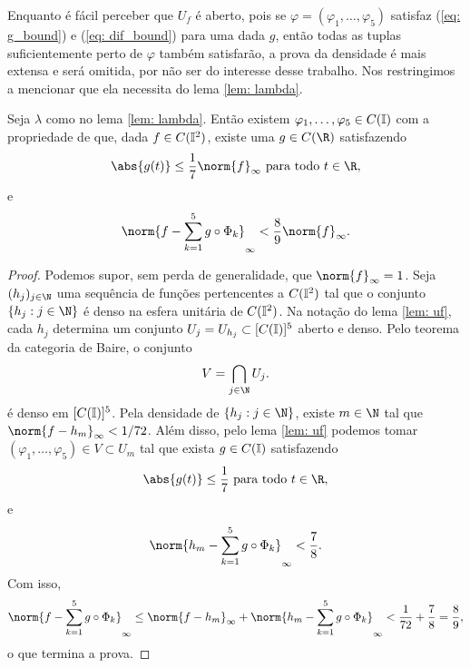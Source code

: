 Enquanto é fácil perceber que \( U_{ f } \) é aberto, pois se \( \varphi = ( \varphi_{ 1 }, \dots, \varphi_{ 5 } ) \) satisfaz (\ref{eq: g_bound}) e (\ref{eq: dif_bound}) para uma dada \( g \), então todas as tuplas suficientemente perto de \( \varphi \) também satisfarão, a prova da densidade é mais extensa e será omitida, por não ser do interesse desse trabalho.
Nos restringimos a mencionar que ela necessita do lema \ref{lem: lambda}.
\begin{lem}
    Seja \( \lambda \) como no lema \ref{lem: lambda}.
    Então existem \( \varphi_{ 1 }, \dots, \varphi_{ 5 } \in C(\mathbb{I}) \) com a propriedade de que, dada \( f \in C(\mathbb{I}^2) \), existe uma \( g \in C(\R) \) satisfazendo
    \begin{equation}
        \abs{ g(t) } \leq \frac{ 1 }{ 7 } \norm{ f }_{ \infty } \text{ para todo } t \in \R
    ,\end{equation}
    e
    \begin{equation}
        \norm{ 
            f - \sum_{ k=1 }^{ 5 } g \circ \Phi_{ k }
         }_{ \infty } < \frac{ 8 }{ 9 } \norm{ f }_{ \infty }
    .\end{equation}
    \label{lem: baire}
\end{lem}
\begin{proof}
    Podemos supor, sem perda de generalidade, que \( \norm{ f }_{ \infty } = 1 \).
    Seja \( (h_{ j })_{ j\in\N } \) uma sequência de funções pertencentes a \( C(\mathbb{I}^2) \) tal que o conjunto \( \left\{ h_{ j } : j\in \N \right\} \) é denso na esfera unitária de \( C(\mathbb{I}^2) \).
    Na notação do lema \ref{lem: uf}, cada \( h_{ j } \) determina um conjunto \( U_{ j } = U_{ h_{ j } } \subset  [C(\mathbb{I})]^{ 5 } \) aberto e denso.
    Pelo teorema da categoria de Baire, o conjunto
    \begin{equation}
        V = \bigcap_{ j\in\N } U_{ j }
    .\end{equation}
    é denso em \( [C(\mathbb{I})]^{ 5 } \).
    Pela densidade de \( \left\{ h_{ j } : j \in \N \right\} \), existe \( m \in \N \) tal que \( \norm{ f - h_{ m } }_{ \infty } < 1/72 \).
    Além disso, pelo lema \ref{lem: uf} podemos tomar \( ( \varphi_{ 1 }, \dots, \varphi_{ 5 } ) \in V \subset  U_{ m } \) tal que exista \( g \in C(\mathbb{I}) \) satisfazendo
    \begin{equation}
        \abs{ g(t) } \leq \frac{ 1 }{ 7 } \text{ para todo } t \in \R
    ,\end{equation}
    e
    \begin{equation}
        \norm{ 
            h_{ m } - \sum_{ k=1 }^{ 5 } g \circ \Phi_{ k }
         }_{ \infty } < \frac{ 7 }{ 8 }
    .\end{equation}
    Com isso,
    \begin{equation}
        \norm{ 
            f - \sum_{ k=1 }^{ 5 } g \circ \Phi_{ k }
         }_{ \infty } \leq
        \norm{ f - h_{ m } }_{ \infty }
        + \norm{ 
            h_{ m } - \sum_{ k=1 }^{ 5 } g \circ \Phi_{ k }
         }_{ \infty }
         < \frac{ 1 }{ 72 } + \frac{ 7 }{ 8 }
         = \frac{ 8 }{ 9 }
    ,\end{equation}
    o que termina a prova.
\end{proof}
